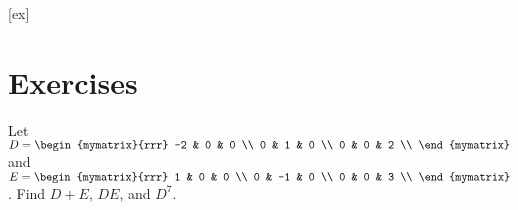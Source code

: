 [ex]
\section*{Exercises}

\begin{enumialphparenastyle}

\begin{ex}
  Let $D=\begin{mymatrix}{rrr}
    -2 & 0 & 0 \\
    0 & 1 & 0 \\
    0 & 0 & 2 \\
  \end{mymatrix}$ and
  $E=\begin{mymatrix}{rrr}
    1 & 0 & 0 \\
    0 & -1 & 0 \\
    0 & 0 & 3 \\
  \end{mymatrix}$.
  Find $D+E$, $DE$, and $D^{7}$.
\end{ex}
  

\end{enumialphparenastyle}
